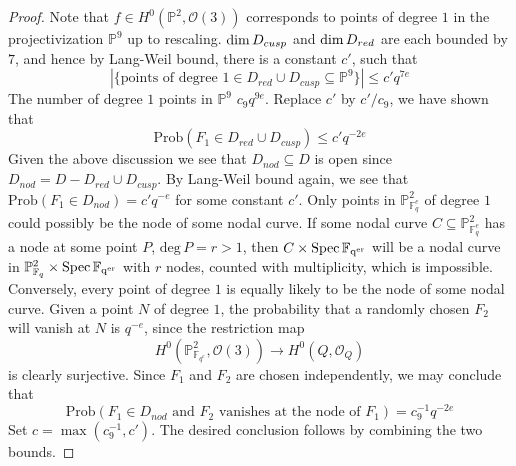 \documentclass[12pt]{article}
\theoremstyle{plain}
\theoremstyle{definition}
\newcommand{\IF}{\mathbb{F}}
\newcommand{\IP}{\mathbb{P}}
\newcommand{\sO}{\mathcal{O}}
\renewcommand{\deg}{\mathrm{deg}\,}
\newcommand{\Spec}{\rm Spec\,}
\renewcommand\dim{{\rm dim\,}}
\newcommand{\<}{\langle}
\renewcommand{\>}{\rangle}
\newcommand{\Prob}{\mathrm{Prob}}
\begin{document}
\begin{proof}
Note that $f \in H^0(\IP^2, \sO(3))$ corresponds to points of degree $1$ in the projectivization $\IP^9$ up to rescaling. 
$\dim D_{cusp}$ and $\dim D_{red}$ are each bounded by $7$, and hence by Lang-Weil bound, there is a constant $c'$, such that 
$$ |\{ \text{points of degree }1 \in D_{red} \cup D_{cusp} \subseteq \IP^9\}| \le c'q^{7e} $$ 
The number of degree $1$ points in $\IP^9$ $c_9 q^{9e}$. Replace $c'$ by $c'/c_9$, we have shown that $$\Prob(F_1 \in D_{red} \cup D_{cusp}) \le c' q^{-2e}$$
Given the above discussion we see that $D_{nod} \subseteq D$ is open since $D_{nod} = D - D_{red} \cup D_{cusp}$. By Lang-Weil bound again, we see that $\Prob(F_1 \in D_{nod}) = c' q^{-e}$ for some constant $c'$. Only points in $\IP^2_{\IF_q^e}$ of degree $1$ could possibly be the node of some nodal curve. If some nodal curve $C \subseteq \IP^2_{\IF_q^e}$ has a node at some point $P$, $\deg P  = r > 1$, then $C \times \Spec \IF_{q^{er}} $ will be a nodal curve in $\IP^2_{\IF_q} \times \Spec \IF_{q^{er}}$ with $r$ nodes, counted with multiplicity, which is impossible. Conversely, every point of degree $1$ is equally likely to be the node of some nodal curve. Given a point $N$ of degree $1$, the probability that a randomly chosen $F_2$ will vanish at $N$ is $q^{-e}$, since the restriction map
$$ H^0(\IP^2_{\IF_{q^e}}, \sO(3)) \to H^0(Q, \sO_Q) $$
is clearly surjective. Since $F_1$ and $F_2$ are chosen independently, we may conclude that 
$$ \Prob(F_1 \in D_{nod} \text{ and } F_2 \text{ vanishes at the node of }F_1 ) = c^{-1}_9 q^{-2e}$$
Set $c = \max(c^{-1}_9, c')$. The desired conclusion follows by combining the two bounds. 
\end{proof}
\end{document}
